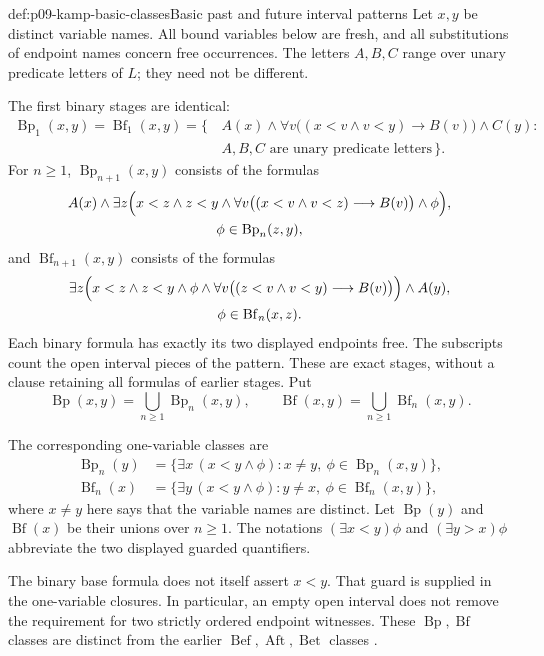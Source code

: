\begin{hbdefinition}{def:p09-kamp-basic-classes}{Basic past and future interval patterns}
Let \(x,y\) be distinct variable names.  All bound variables below are
fresh, and all substitutions of endpoint names concern free occurrences.
The letters \(A,B,C\) range over unary predicate letters of \(L\);
they need not be different.

The first binary stages are identical:
\[
\begin{split}
 \operatorname{Bp}_1(x,y)=\operatorname{Bf}_1(x,y)
 =\bigl\{\,&A(x)\land
       \forall v\bigl((x<v\land v<y)\longrightarrow B(v)\bigr)
       \land C(y):\\[-2pt]
       &A,B,C\text{ are unary predicate letters}\,\bigr\}.
\end{split}
\]
For \(n\geq1\), \(\operatorname{Bp}_{n+1}(x,y)\) consists of the
formulas
\[
\begin{gathered}
 A(x)\land\exists z\Bigl(
 x<z\land z<y\land
 \forall v\bigl((x<v\land v<z)\longrightarrow B(v)\bigr)
 \land\phi\Bigr),
 \\
 \phi\in\operatorname{Bp}_n(z,y),
\end{gathered}
\]
and \(\operatorname{Bf}_{n+1}(x,y)\) consists of the formulas
\[
\begin{gathered}
 \exists z\Bigl(
 x<z\land z<y\land\phi\land
 \forall v\bigl((z<v\land v<y)\longrightarrow B(v)\bigr)
 \Bigr)\land A(y),
 \\
 \phi\in\operatorname{Bf}_n(x,z).
\end{gathered}
\]
Each binary formula has exactly its two displayed endpoints free.
The subscripts count the open interval pieces of the pattern.  These are
exact stages, without a clause retaining all formulas of earlier stages.
Put
\[
 \operatorname{Bp}(x,y)=\bigcup_{n\geq1}\operatorname{Bp}_n(x,y),
 \qquad
 \operatorname{Bf}(x,y)=\bigcup_{n\geq1}\operatorname{Bf}_n(x,y).
\]

The corresponding one-variable classes are
\[
\begin{split}
 \operatorname{Bp}_n(y)
   &=\{\exists x\,(x<y\land\phi):
              x\ne y,\ \phi\in\operatorname{Bp}_n(x,y)\},\\
 \operatorname{Bf}_n(x)
   &=\{\exists y\,(x<y\land\phi):
              y\ne x,\ \phi\in\operatorname{Bf}_n(x,y)\},
\end{split}
\]
where \(x\ne y\) here says that the variable names are distinct.
Let \(\operatorname{Bp}(y)\) and \(\operatorname{Bf}(x)\) be their
unions over \(n\geq1\).  The notations
\((\exists x<y)\phi\) and \((\exists y>x)\phi\) abbreviate the two
displayed guarded quantifiers.

The binary base formula does not itself assert \(x<y\).  That guard
is supplied in the one-variable closures.  In particular, an empty open
interval does not remove the requirement for two strictly ordered
endpoint witnesses.  These \(\operatorname{Bp},\operatorname{Bf}\)
classes are distinct from the earlier
\(\operatorname{Bef},\operatorname{Aft},\operatorname{Bet}\) classes
\cite[ch.~III, pp.~63--66]{Kamp1968}.
\end{hbdefinition}

